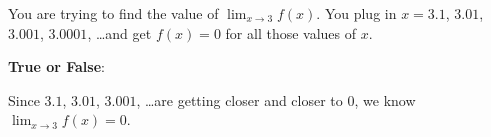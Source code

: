 \documentclass{ximera}
\author{Bobby Ramsey}
\begin{document}
\begin{exercise}

	You are trying to find the value of $\displaystyle \lim_{x\to 3} f(x)$.  You plug in $x=3.1$, $3.01$, $3.001$, $3.0001$, \ldots and get $f(x) =0$ for all those values of $x$.
	
	\textbf{True or False}:
	
		Since $3.1$, $3.01$, $3.001$, \ldots are getting closer and closer to $0$, we know $\displaystyle \lim_{x\to3} f(x) = 0$.
		\begin{multipleChoice}
		\end{multipleChoice}	
\end{exercise}
\end{document}
